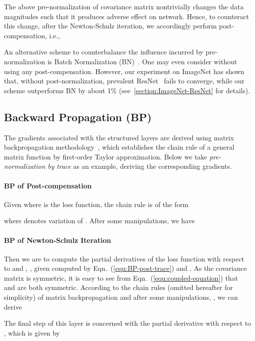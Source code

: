 \documentclass[10pt,twocolumn,letterpaper]{article}
\begin{document}
The above pre-normalization of  covariance matrix nontrivially changes the data magnitudes such that it produces adverse effect on network. Hence, to counteract this change, after the Newton-Schulz iteration,  we accordingly perform post-compensation, i.e.,

An alternative scheme to  counterbalance the influence incurred by  pre-normalization is Batch Normalization (BN)~\cite{DBLP:journals/corr/IoffeS15}. One may even consider without using any post-compensation. However, our experiment on ImageNet  has shown that, without post-normalization, prevalent ResNet~\cite{He_2016_CVPR} fails to converge, while our scheme outperforms BN by about 1\% (see~\ref{section:ImageNet-ResNet} for details).

\subsection{Backward Propagation (BP)}\label{subsection:backward}

The gradients associated with the structured layers are derived using matrix backpropagation methodology~\cite{IonescuVS15}, which establishes the chain rule of a general matrix function by  first-order Taylor approximation.  Below we take \textit{pre-normalization by trace} as an example, deriving the corresponding gradients.

\paragraph{BP of Post-compensation} Given  where  is the loss function, the chain rule is of the form 

where  denotes variation of . After some manipulations, we have


\paragraph{BP of Newton-Schulz Iteration} Then we are to compute the partial derivatives of the loss function with respect to  and , , given  computed by Eqn.~(\ref{equ:BP-post-trace}) and  . As the covariance matrix  is symmetric, it is easy to see from Eqn.~(\ref{equ:coupled-equation}) that  and  are both symmetric. According to the chain rules (omitted hereafter  for simplicity) of matrix backpropagation and after some manipulations, , we can derive

The final step of this layer is concerned with the partial derivative with respect to , which is given by
\end{document}
